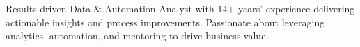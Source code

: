 Results-driven Data \& Automation Analyst with 14+ years' experience delivering actionable insights and process improvements. Passionate about leveraging analytics, automation, and mentoring to drive business value.
